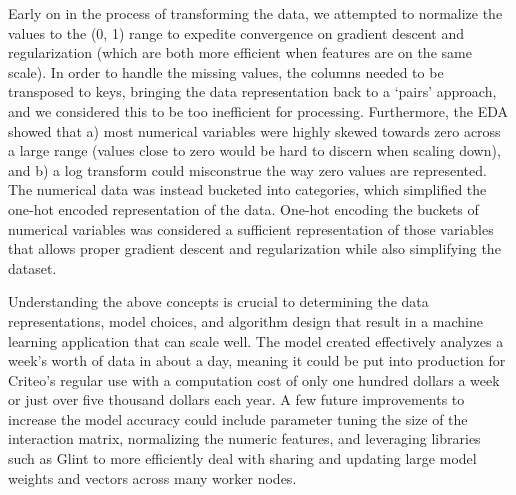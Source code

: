\documentclass[11pt]{article}
\begin{document}
Early on in the process of transforming the data, we attempted to
normalize the values to the (0, 1) range to expedite convergence on
gradient descent and regularization (which are both more efficient when
features are on the same scale). In order to handle the missing values,
the columns needed to be transposed to keys, bringing the data
representation back to a `pairs' approach, and we considered this to be
too inefficient for processing. Furthermore, the EDA showed that a) most
numerical variables were highly skewed towards zero across a large range
(values close to zero would be hard to discern when scaling down), and
b) a log transform could misconstrue the way zero values are
represented. The numerical data was instead bucketed into categories,
which simplified the one-hot encoded representation of the data. One-hot
encoding the buckets of numerical variables was considered a sufficient
representation of those variables that allows proper gradient descent
and regularization while also simplifying the dataset.

Understanding the above concepts is crucial to determining the data
representations, model choices, and algorithm design that result in a
machine learning application that can scale well. The model created
effectively analyzes a week's worth of data in about a day, meaning it
could be put into production for Criteo's regular use with a computation
cost of only one hundred dollars a week or just over five thousand
dollars each year. A few future improvements to increase the model
accuracy could include parameter tuning the size of the interaction
matrix, normalizing the numeric features, and leveraging libraries such
as Glint to more efficiently deal with sharing and updating large model
weights and vectors across many worker nodes.


    
    
    
    
\end{document}
